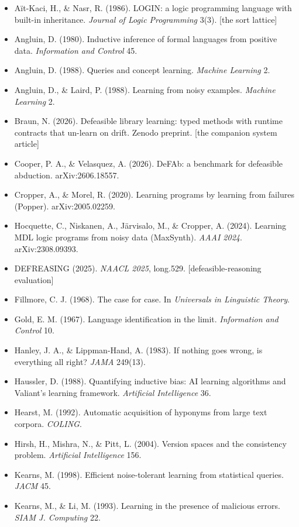 \documentclass[11pt]{article}
\begin{document}
\begin{itemize}
\item Aït-Kaci, H., \& Nasr, R. (1986). LOGIN: a logic programming language with built-in inheritance. \emph{Journal of Logic Programming} 3(3). [the sort lattice]
\item Angluin, D. (1980). Inductive inference of formal languages from positive data. \emph{Information and Control} 45.
\item Angluin, D. (1988). Queries and concept learning. \emph{Machine Learning} 2.
\item Angluin, D., \& Laird, P. (1988). Learning from noisy examples. \emph{Machine Learning} 2.
\item Braun, N. (2026). Defeasible library learning: typed methods with runtime contracts that un-learn on drift. Zenodo preprint. [the companion system article]
\item Cooper, P. A., \& Velasquez, A. (2026). DeFAb: a benchmark for defeasible abduction. arXiv:2606.18557.
\item Cropper, A., \& Morel, R. (2020). Learning programs by learning from failures (Popper). arXiv:2005.02259.
\item Hocquette, C., Niskanen, A., Järvisalo, M., \& Cropper, A. (2024). Learning MDL logic programs from noisy data (MaxSynth). \emph{AAAI 2024}. arXiv:2308.09393.
\item DEFREASING (2025). \emph{NAACL 2025}, long.529. [defeasible-reasoning evaluation]
\item Fillmore, C. J. (1968). The case for case. In \emph{Universals in Linguistic Theory}.
\item Gold, E. M. (1967). Language identification in the limit. \emph{Information and Control} 10.
\item Hanley, J. A., \& Lippman-Hand, A. (1983). If nothing goes wrong, is everything all right? \emph{JAMA} 249(13).
\item Haussler, D. (1988). Quantifying inductive bias: AI learning algorithms and Valiant's learning framework. \emph{Artificial Intelligence} 36.
\item Hearst, M. (1992). Automatic acquisition of hyponyms from large text corpora. \emph{COLING}.
\item Hirsh, H., Mishra, N., \& Pitt, L. (2004). Version spaces and the consistency problem. \emph{Artificial Intelligence} 156.
\item Kearns, M. (1998). Efficient noise-tolerant learning from statistical queries. \emph{JACM} 45.
\item Kearns, M., \& Li, M. (1993). Learning in the presence of malicious errors. \emph{SIAM J. Computing} 22.

\end{itemize}
\end{document}
